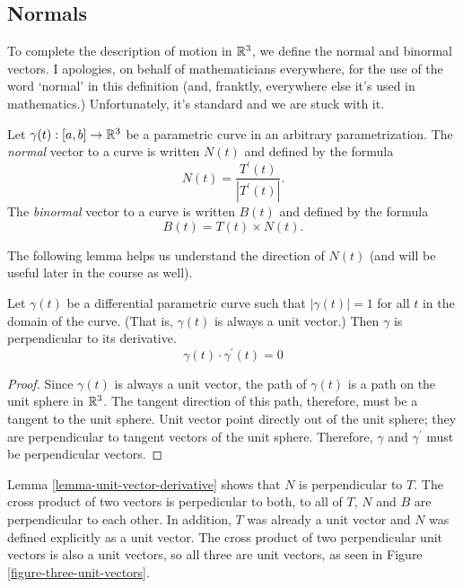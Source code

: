 \documentclass[fleqn,letterpaper]{report}
\begin{document}
\subsection{Normals}
\label{normals}

To complete the description of motion in $\mathbb{R}^3$, we define
the normal and binormal vectors. I apologies, on behalf of
mathematicians everywhere, for the use of the word `normal' in
this definition (and, franktly, everywhere else it's used in
mathematics.) Unfortunately, it's standard and we are stuck
with it. 

\begin{defn}
Let $\gamma(t): [a,b] \rightarrow \mathbb{R}^3$ be a parametric curve
in an arbitrary parametrization. The \emph{normal} vector to a curve 
is written $N(t)$ and defined by the formula
\begin{equation*}
N(t) = \frac{T^\prime(t)}{|T^\prime(t)|}.
\end{equation*}
The \emph{binormal} vector to a curve is written $B(t)$ and defined
by the formula
\begin{equation*}
B(t) = T(t) \times N(t).
\end{equation*}
\end{defn}

The following lemma helps us understand the direction of
$N(t)$ (and will be useful later in the course as well). 

\begin{lem}
\label{lemma-unit-vector-derivative}
Let $\gamma(t)$ be a differential parametric curve such that
$|\gamma(t)| = 1$ for all $t$ in the domain of the curve.
(That is, $\gamma(t)$ is always a unit vector.) Then $\gamma$
is perpendicular to its derivative.
\begin{equation*}
\gamma(t) \cdot \gamma^\prime(t) = 0 
\end{equation*}
\end{lem}

\begin{proof}
Since $\gamma(t)$ is always a unit vector, the path of
$\gamma(t)$ is a path on the unit sphere in $\mathbb{R}^3$. The
tangent direction of this path, therefore, must be a tangent
to the unit sphere. Unit vector point directly out of the unit
sphere; they are perpendicular to tangent vectors of the unit
sphere. Therefore, $\gamma$ and $\gamma^\prime$ must be
perpendicular vectors. 
\end{proof}

Lemma \ref{lemma-unit-vector-derivative} shows that $N$ is
perpendicular to $T$. The cross product of two vectors is
perpedicular to both, to all of $T$, $N$ and $B$ are
perpendicular to each other. In addition, $T$ was already a
unit vector and $N$ was defined explicitly as a unit vector.
The cross product of two perpendicular unit vectors is also a
unit vectors, so all three are unit vectors, as seen in Figure
\ref{figure-three-unit-vectors}.
\end{document}
